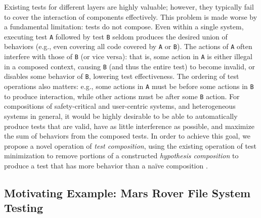 Existing tests for different layers are highly valuable;
however, they typically fail to cover the interaction of components
effectively.  This problem is made worse by a fundamental limitation:
tests do not compose.  Even within a single system, executing test
{\tt A}
followed by test {\tt B} seldom produces the desired union of behaviors
(e.g., even covering all code covered by {\tt A} or {\tt B}).  The
actions of {\tt A}
often interfere with those of {\tt B} (or vice versa): that is, some action
in {\tt A} is either illegal in a composed context, causing {\tt B} (and thus the
entire test) to become invalid, or
disables some behavior of {\tt B}, lowering test effectiveness.  The
ordering of test operations also matters: e.g., some actions in {\tt A} must be
before some actions in {\tt B} to produce interaction, while other actions
must be after some {\tt B} action.  For compositions of safety-critical and
user-centric systems, and heterogeneous systems in general, it would
be highly desirable to be able to automatically produce tests that are
valid, have as little interference as possible, and maximize the sum
of behaviors from the composed tests.   In order to achieve this goal, we propose a novel operation
of \emph{test composition}, using the existing operation of
test minimization \cite{DD,icst2014,OneTest} to remove portions of a
constructed \emph{hypothesis composition} to produce a test that has more
behavior than a na\"ive composition \cite{tecpscompose}.

\subsection{Motivating Example: Mars Rover File System Testing}

